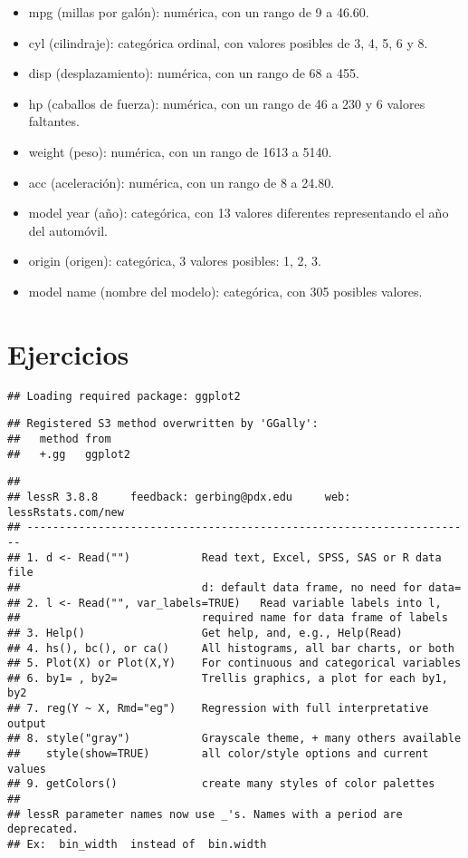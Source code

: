 \documentclass[]{article}
\providecommand{\tightlist}{%
  \setlength{\itemsep}{0pt}\setlength{\parskip}{0pt}}
\begin{document}
\begin{itemize}
\tightlist
\item
  mpg (millas por galón): numérica, con un rango de 9 a 46.60.
\item
  cyl (cilindraje): categórica ordinal, con valores posibles de 3, 4, 5,
  6 y 8.
\item
  disp (desplazamiento): numérica, con un rango de 68 a 455.
\item
  hp (caballos de fuerza): numérica, con un rango de 46 a 230 y 6
  valores faltantes.
\item
  weight (peso): numérica, con un rango de 1613 a 5140.
\item
  acc (aceleración): numérica, con un rango de 8 a 24.80.
\item
  model year (año): categórica, con 13 valores diferentes representando
  el año del automóvil.
\item
  origin (origen): categórica, 3 valores posibles: 1, 2, 3.
\item
  model name (nombre del modelo): categórica, con 305 posibles valores.
\end{itemize}

\hypertarget{ejercicios}{%
\section{Ejercicios}\label{ejercicios}}

\begin{verbatim}
## Loading required package: ggplot2
\end{verbatim}

\begin{verbatim}
## Registered S3 method overwritten by 'GGally':
##   method from   
##   +.gg   ggplot2
\end{verbatim}

\begin{verbatim}
## 
## lessR 3.8.8     feedback: gerbing@pdx.edu     web: lessRstats.com/new
## ---------------------------------------------------------------------
## 1. d <- Read("")           Read text, Excel, SPSS, SAS or R data file
##                            d: default data frame, no need for data=
## 2. l <- Read("", var_labels=TRUE)   Read variable labels into l,
##                            required name for data frame of labels
## 3. Help()                  Get help, and, e.g., Help(Read)
## 4. hs(), bc(), or ca()     All histograms, all bar charts, or both
## 5. Plot(X) or Plot(X,Y)    For continuous and categorical variables
## 6. by1= , by2=             Trellis graphics, a plot for each by1, by2
## 7. reg(Y ~ X, Rmd="eg")    Regression with full interpretative output
## 8. style("gray")           Grayscale theme, + many others available
##    style(show=TRUE)        all color/style options and current values
## 9. getColors()             create many styles of color palettes
## 
## lessR parameter names now use _'s. Names with a period are deprecated.
## Ex:  bin_width  instead of  bin.width
\end{verbatim}
\end{document}
